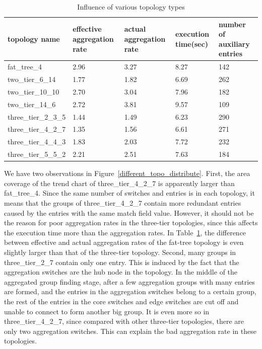\begin{table}
\centering
\caption{Influence of various topology types}
\begin{tabular}{|l|p{2.5cm}|p{2.5cm}|p{1.9cm}|p{2.8cm}|}
\hline topology name & effective aggregation rate & actual aggregation rate & execution time(sec) & number of auxiliary entries \\
\hline
\hline fat\_tree\_4 & 2.96 & 3.27 & 8.27 & 142 \\
\hline two\_tier\_6\_14 & 1.77 & 1.82 & 6.69 & 262 \\ 
\hline two\_tier\_10\_10 & 2.70 & 3.04 & 7.96 & 182 \\
\hline two\_tier\_14\_6 & 2.72 & 3.81 & 9.57 & 109 \\ 
\hline three\_tier\_2\_3\_5 & 1.44 & 1.49 & 6.23 & 290 \\
\hline three\_tier\_4\_2\_7 & 1.35 & 1.56 & 6.61 & 271 \\
\hline three\_tier\_4\_4\_3 & 1.83 & 2.03 & 7.72 & 232 \\
\hline three\_tier\_5\_5\_2 & 2.21 & 2.51 & 7.63 & 184 \\
\hline
\end{tabular}
\label{table:different_topo_type}
\end{table}

We have two observations in Figure~\ref{different_topo_distribute}. First, the area coverage of the trend chart of three\_tier\_4\_2\_7 is apparently larger than fat\_tree\_4. Since the same number of switches and entries is in each topology, it means that the groups of three\_tier\_4\_2\_7 contain more redundant entries caused by the entries with the same match field value. However, it  should not be the reason for poor aggregation rates in the three-tier topologies, since this  affects the execution time more than the aggregation rates. In Table~\ref{table:different_topo_type}, the difference between effective and actual aggregation rates of the fat-tree topology is even slightly larger than that of the three-tier topology. Second, many groups in three\_tier\_2\_7 contain only one entry. This is induced by the fact that the aggregation switches are the hub node in the topology. In the middle of the aggregated group finding stage, after a few aggregation groups with many entries are formed, and the entries in the aggregation switches belong to a certain group, the rest of the entries in the core switches and edge switches are cut off and unable to connect to form another big group. It is even more so in three\_tier\_4\_2\_7, since compared with other three-tier topologies, there are only two aggregation switches. This can explain the bad aggregation rate in these topologies.

